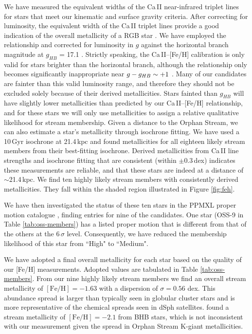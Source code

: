 \documentclass{emulateapj}
\begin{document}
We have measured the equivalent widths of the Ca\,\textsc{II} near-infrared triplet lines for stars that meet our kinematic and surface gravity criteria. After correcting for luminosity, the equivalent width of the Ca\,\textsc{II} triplet lines provide a good indication of the overall metallicity of a RGB star \citep{Amandroff;Da_Costa_1991}. We have employed the \citet{Starkenburg;et-al_2010} relationship and corrected for luminosity in $g$ against the horizontal branch magnitude at $g_{HB}$ = 17.1 \citep{Newberg;et-al_2010}. Strictly speaking, the Ca\,\textsc{II}\---[Fe/H] calibration is only valid for stars brighter than the horizontal branch, although the relationship only becomes significantly inappropriate near $g \-- g_{HB} \sim +1$ \citep{Saviane;et-al_2012}. Many of our candidates are fainter than this valid luminosity range, and therefore they should not be excluded solely because of their derived metallicities. Stars fainted than $g_{HB}$ will have slightly lower metallicities than predicted by our Ca\,\textsc{II}\---[Fe/H] relationship, and for these stars we will only use metallicities to assign a relative qualitative likelihood for stream membership.
Given a distance to the Orphan Stream, we can also estimate a star's metallicity through isochrone fitting. We have used a 10\,Gyr \citet{Girardi;et-al_2008} isochrone at 21.4\,kpc \citep{Newberg;et-al_2010} and found metallicities for all eighteen likely stream members from their best-fitting isochrone. Derived metallicities from Ca\,\textsc{II} line strengths and isochrone fitting that are consistent (within $\pm0.3$\,dex) indicates these measurements are reliable, and that these stars are indeed at a distance of $\sim$21.4\,kpc. We find ten highly likely stream members with consistently derived metallicities. They fall within the shaded region illustrated in Figure \ref{fig:feh}. 

We have then investigated the status of these ten stars in the PPMXL proper motion catalogue \citep{Roeser;et-al_2010}, finding entries for nine of the candidates. One star (OSS-9 in Table \ref{tab:oss-members}) has a listed proper motion that is different from that of the others at the $6\,\sigma$ level. Consequently, we have reduced the membership likelihood of this star from ``High" to ``Medium".

We have adopted a final overall metallicity for each star based on the quality of our [Fe/H] measurements. Adopted values are tabulated in Table \ref{tab:oss-members}. From our nine highly likely stream members we find an overall stream metallicity of $[\mbox{Fe/H}] = -1.63$ with a dispersion of $\sigma = 0.56$ dex. This abundance spread is larger than typically seen in globular cluster stars and is more representative of the chemical spreads seen in dSph satellites. \citet{Newberg;et-al_2010} found a stream metallicity of $[\mbox{Fe/H}] = -2.1$ from BHB stars, which is not inconsistent with our measurement given the spread in Orphan Stream K-giant metallicities.
\end{document}
